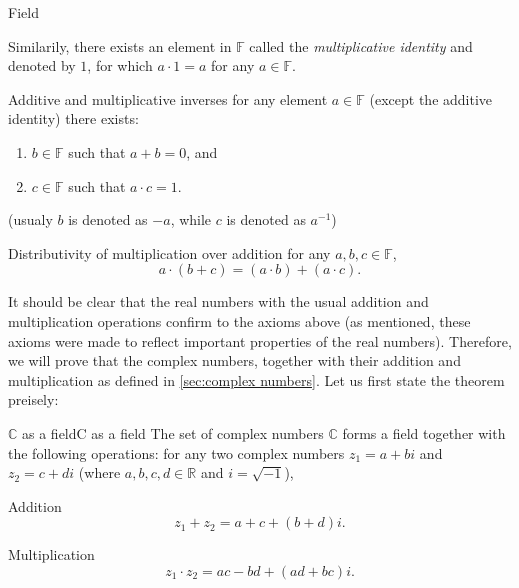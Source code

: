 \begin{definition}{Field}{}
\begin{descitemize}
			Similarily, there exists an element in $\mathbb{F}$ called the \textit{multiplicative identity} and denoted by $1$, for which $a\cdot1=a$ for any $a\in\mathbb{F}$.

		\item[Additive and multiplicative inverses] for any element $a\in\mathbb{F}$ (except the additive identity) there exists:
			\begin{enumerate}
				\item $b\in\mathbb{F}$ such that $a+b=0$, and
				\item $c\in\mathbb{F}$ such that $a\cdot c=1$.
			\end{enumerate}
			(usualy $b$ is denoted as $-a$, while $c$ is denoted as $a^{-1}$)

		\item[Distributivity of multiplication over addition] for any $a,b,c\in\mathbb{F}$,
			\[
				a\cdot(b+c) = (a\cdot b) + (a\cdot c).
			\]
	\end{descitemize}
\end{definition}

It should be clear that the real numbers with the usual addition and multiplication operations confirm to the axioms above (as mentioned, these axioms were made to reflect important properties of the real numbers). Therefore, we will prove that the complex numbers, together with their addition and multiplication as defined in \autoref{sec:complex numbers}. Let us first state the theorem preisely:

\begin{theorem}{$\bm{\mathbb{C}}$ as a field}{C as a field}
	The set of complex numbers $\mathbb{C}$ forms a field together with the following operations: for any two complex numbers $z_{1}=a+bi$ and $z_{2}=c+di$ (where $a,b,c,d\in\mathbb{R}$ and $i=\sqrt{-1}$),
	\begin{descitemize}
		\item[Addition]
			\[
				z_{1} + z_{2} = a+c + (b+d)i.
			\]
		\item[Multiplication]
			\[
				z_{1} \cdot z_{2} = ac-bd + (ad+bc)i.
			\]
	\end{descitemize}
\end{theorem}

